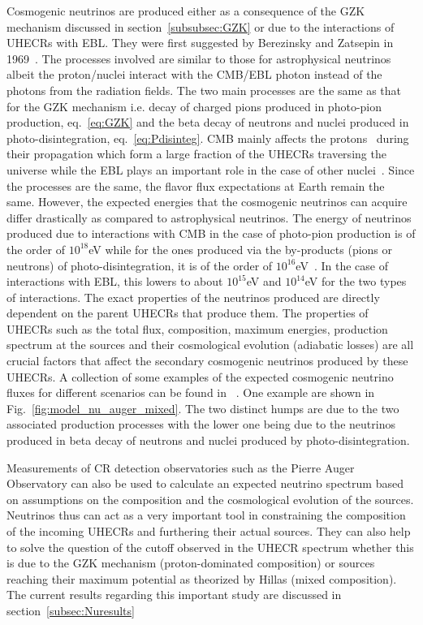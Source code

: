 Cosmogenic neutrinos are produced either as a consequence of the \gls{GZK} mechanism discussed in section~\ref{subsubsec:GZK} or due to the interactions of \glspl{UHECR} with \gls{EBL}. They were first suggested by Berezinsky and Zatsepin in 1969~\cite{Berezinsky:1970xj}. The processes involved are similar to those for astrophysical neutrinos albeit the proton/nuclei interact with the CMB/EBL photon instead of the photons from the radiation fields. The two main processes are the same as that for the GZK mechanism i.e. decay of charged pions produced in photo-pion production, eq.~\ref{eq:GZK} and the beta decay of neutrons and nuclei produced in photo-disintegration, eq.~\ref{eq:Pdisinteg}. \gls{CMB} mainly affects the protons~\cite{Ehlert_2024} during their propagation which form a large fraction of the \glspl{UHECR} traversing the universe while the EBL plays an important role in the case of other nuclei~\cite{Aloisio_2015}. 
Since the processes are the same, the flavor flux expectations at Earth remain the same. However, the expected energies that the cosmogenic neutrinos can acquire differ drastically as compared to astrophysical neutrinos. The energy of neutrinos produced due to interactions with \gls*{CMB} in the case of photo-pion production is of the order of $10^{18}$eV while for the ones produced via the by-products (pions or neutrons) of photo-disintegration, it is of the order of $10^{16}$eV~\cite{Aloisio_2015}. In the case of interactions with \gls*{EBL}, this lowers to about $10^{15}$eV and $10^{14}$eV for the two types of interactions. 
The exact properties of the neutrinos produced are directly dependent on the parent \glspl*{UHECR} that produce them. The properties of \glspl{UHECR} such as the total flux, composition, maximum energies, production spectrum at the sources and their cosmological evolution (adiabatic losses) are all crucial factors that affect the  secondary cosmogenic neutrinos produced by these \glspl*{UHECR}. A collection of some examples of the expected cosmogenic neutrino fluxes for different scenarios can be found in ~\cite{KAMPERT2012660,AlvesBatista:2018zui,Heinze:2019jou}. One example are shown in Fig.~\ref{fig:model_nu_auger_mixed}. The two distinct humps are due to the two associated production processes with the lower one being due to the neutrinos produced in beta decay of neutrons and nuclei produced by photo-disintegration. 

Measurements of \gls*{CR} detection observatories such as the Pierre Auger Observatory can also be used to calculate an expected neutrino spectrum based on assumptions on the composition and the cosmological evolution of the sources. Neutrinos thus can act as a very important tool in constraining the composition of the incoming \glspl*{UHECR} and furthering their actual sources. They can also help to solve the question of the cutoff observed in the \gls*{UHECR} spectrum whether this is due to the \gls*{GZK} mechanism (proton-dominated composition) or sources reaching their maximum potential as theorized by Hillas (mixed composition). The current results regarding this important study are discussed in section~\ref{subsec:Nuresults}



